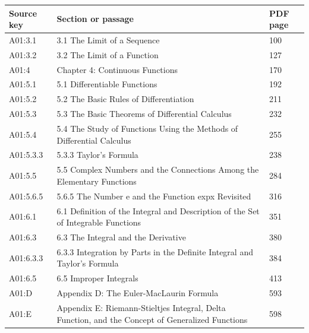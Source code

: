 \documentclass[11pt,oneside,a4paper]{book}
\theoremstyle{definition}
\theoremstyle{remark}
\begin{document}
\begin{longtable}{p{22mm}p{99mm}p{20mm}}

\toprule Source key & Section or passage & PDF page \\\midrule\endhead

A01:3.1 & 3.1 The Limit of a Sequence & 100 \\

A01:3.2 & 3.2 The Limit of a Function & 127 \\

A01:4 & Chapter 4: Continuous Functions & 170 \\

A01:5.1 & 5.1 Differentiable Functions & 192 \\

A01:5.2 & 5.2 The Basic Rules of Differentiation & 211 \\

A01:5.3 & 5.3 The Basic Theorems of Differential Calculus & 232 \\

A01:5.4 & 5.4 The Study of Functions Using the Methods of Differential Calculus & 255 \\

A01:5.3.3 & 5.3.3 Taylor's Formula & 238 \\

A01:5.5 & 5.5 Complex Numbers and the Connections Among the Elementary Functions & 284 \\

A01:5.6.5 & 5.6.5 The Number e and the Function expx Revisited & 316 \\

A01:6.1 & 6.1 Definition of the Integral and Description of the Set of Integrable Functions & 351 \\

A01:6.3 & 6.3 The Integral and the Derivative & 380 \\

A01:6.3.3 & 6.3.3 Integration by Parts in the Definite Integral and Taylor's Formula & 384 \\

A01:6.5 & 6.5 Improper Integrals & 413 \\

A01:D & Appendix D: The Euler-MacLaurin Formula & 593 \\

A01:E & Appendix E: Riemann-Stieltjes Integral, Delta Function, and the Concept of Generalized Functions & 598 \\


\end{longtable}
\end{document}
